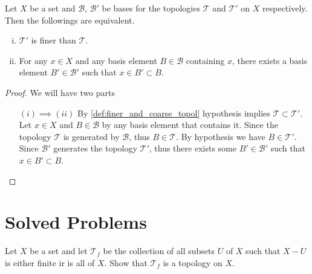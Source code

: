 \begin{proposition}
	Let $ X $ be a set and $ \mathcal{B} $, $ \mathcal{B}' $ be bases for the topologies $ \mathcal{T} $ and $ \mathcal{T}' $ on $ X $ respectively. Then the followings are equivalent.
	\begin{enumerate}[(i)]
		\item $ \mathcal{T}'$ is finer than $ \mathcal{T} $.
		\item For any $ x\in X $ and any basis element $ B \in \mathcal{B} $ containing $ x $, there exists a basis element $ B' \in \mathcal{B}' $ such that  $ x\in B' \subset B $.
	\end{enumerate}
\end{proposition}
\begin{proof}
	We will have two parts
	\begin{itemize}
		\item [$\boxed{(i) \implies (ii)}$] By \autoref{def:finer_and_coarse_topol} hypothesis implies $ \mathcal{T} \subset \mathcal{T}' $. Let $ x \in X $ and $ B \in \mathcal{B} $ by any basis element that contains it. Since the topology $ \mathcal{T} $ is generated by $ \mathcal{B} $, thus $ B \in \mathcal{T} $. By hypothesis we have $ B \in \mathcal{T}' $. Since $ \mathcal{B}' $ generates the topology $ \mathcal{T}' $, thus there exists some $ B' \in \mathcal{B}' $ such that $ x \in B' \subset B $.
	\end{itemize}
\end{proof}













\section{Solved Problems}


\begin{problem}
	Let $ X $ be a set and let $ \mathcal{T}_f $ be the collection of all subsets $ U $ of $ X $ such that $ X - U $ is either finite ir is all of $ X $. Show that $ \mathcal{T}_f $ is a topology on $ X $.
\end{problem}

